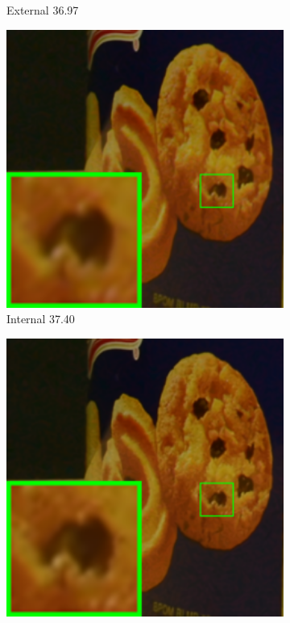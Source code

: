 \begin{figure}
\begin{subfigure}[t]{0.19\textwidth}
		\caption{External 36.97}
    \end{subfigure}
    \hfill
    \begin{subfigure}[t]{0.19\textwidth}
        \centering
        \includegraphics[width=1\textwidth]{images/guided/resize_br_Online_CC_Noisy_Nikon_D600_ISO_3200_C1_94b.png}
\caption{Internal 37.40}
    \end{subfigure}
    \hfill
    \begin{subfigure}[t]{0.19\textwidth}
        \centering
        \includegraphics[width=1\textwidth]{images/guided/resize_br_Guided_CC_Noisy_Nikon_D600_ISO_3200_C1_94b.png}

\end{subfigure}
\end{figure}
